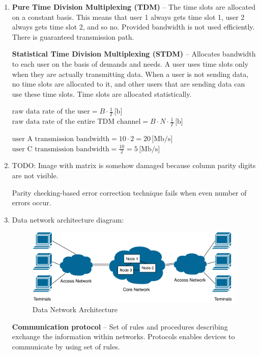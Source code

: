\documentclass[a4paper, 11pt]{article}
\begin{document}
	\begin{enumerate}
		\item %
			\textbf{Pure Time Division Multiplexing (TDM)} -- The time slots are allocated on a constant basis.
			This means that user 1 always gets time slot 1, user 2 always gets time slot 2, and so no.
			Provided bandwidth is not used efficiently. There is guaranteed transmission path.

			\textbf{Statistical Time Division Multiplexing (STDM)} -- Allocates bandwidth to each user on the basis
			of demands and needs. A user uses time slots only when they are actually transmitting data.
			When a user is not sending data, no time slots are allocated to it, and other users that
			are sending data can use these time slots. Time slots are allocated statistically.

			$ \text{raw data rate of the user} = B \cdot \frac{1}{T} \, \text{[b]} $ \\
			$ \text{raw data rate of the entire TDM channel} = B \cdot N \cdot \frac{1}{T} \, \text{[b]} $

			$ \text{user A transmission bandwidth} = 10 \cdot 2 = 20 \, \text{[Mb/s]} $ \\
			$ \text{user C transmission bandwidth} = \frac{10}{2} = 5 \, \text{[Mb/s]} $

		\item %
			TODO: Image with matrix is somehow damaged because column parity digits are not visible.

			Parity checking-based error correction technique fails when even number of errors occur.

		\item %
			Data network architecture diagram:
			\begin{figure}[ht]
				\centering
				\includegraphics[width=0.7\linewidth]{inc/data_network_architecture.pdf}
				\caption{Data Network Architecture}
				\label{figure:data_network_architecture}
			\end{figure}

			\textbf{Communication protocol} -- Set of rules and procedures describing exchange the information
			within networks. Protocols enables devices to communicate by using set of rules.


\end{enumerate}
\end{document}
